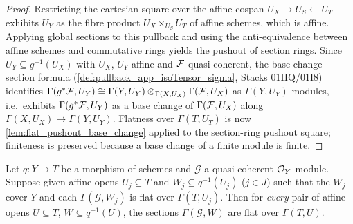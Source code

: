 \begin{proof}
  \leanok
  Restricting the cartesian square over the affine cospan
  \(U_X \to U_S \leftarrow U_T\) exhibits \(U_Y\) as the fibre product
  \(U_X \times_{U_S} U_T\) of affine schemes, which is affine.  Applying
  global sections to this pullback and using the anti-equivalence between
  affine schemes and commutative rings yields the pushout of section rings.
  Since \(U_Y \subseteq g^{-1}(U_X)\) with \(U_X\), \(U_Y\) affine and
  \(\mathcal{F}\) quasi-coherent, the base-change section formula
  (\cref{def:pullback_app_isoTensor_sigma}, Stacks 01HQ/01I8) identifies
  \(\Gamma(g^* \mathcal{F}, U_Y) \cong
    \Gamma(Y, U_Y) \otimes_{\Gamma(X, U_X)} \Gamma(\mathcal{F}, U_X)\)
  as \(\Gamma(Y, U_Y)\)-modules, i.e.\ exhibits \(\Gamma(g^*\mathcal{F}, U_Y)\) as a
  base change of \(\Gamma(\mathcal{F}, U_X)\) along
  \(\Gamma(X, U_X) \to \Gamma(Y, U_Y)\).  Flatness over \(\Gamma(T, U_T)\)
  is now \cref{lem:flat_pushout_base_change} applied to the section-ring
  pushout square; finiteness is preserved because a base change of a finite
  module is finite.
\end{proof}

\begin{lemma}

\leanok
  \label{lem:flat_affine_local}
  Let \(q : Y \to T\) be a morphism of schemes and \(\mathcal G\) a quasi-coherent
  \(\mathcal{O}_Y\)-module.  Suppose given affine opens
  \(U_j \subseteq T\) and \(W_j \subseteq q^{-1}(U_j)\) (\(j \in J\)) such
  that the \(W_j\) cover \(Y\) and each \(\Gamma(\mathcal G, W_j)\) is flat over
  \(\Gamma(T, U_j)\).  Then for \emph{every} pair of affine opens
  \(U \subseteq T\), \(W \subseteq q^{-1}(U)\), the sections
  \(\Gamma(\mathcal G, W)\) are flat over \(\Gamma(T, U)\).
\end{lemma}


